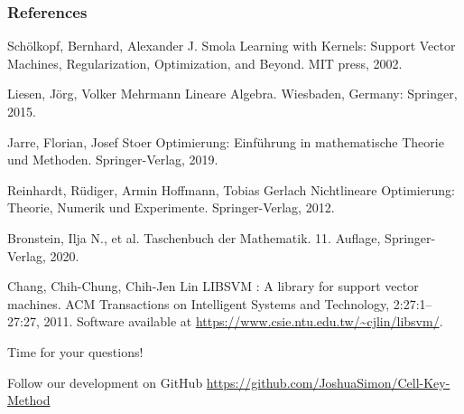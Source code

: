 \documentclass[aspectratio=169]{beamer}
\begin{document}
\begin{frame}
    \frametitle{References}
    \footnotesize{
        \begin{thebibliography}{99} %
             Schölkopf, Bernhard, Alexander J. Smola
            \newblock Learning with Kernels: Support Vector Machines, Regularization, Optimization, and Beyond. MIT press, 2002.

             Liesen, Jörg, Volker Mehrmann
            \newblock Lineare Algebra. Wiesbaden, Germany: Springer, 2015.

             Jarre, Florian, Josef Stoer
            \newblock Optimierung: Einführung in mathematische Theorie und Methoden. Springer-Verlag, 2019.

             Reinhardt, Rüdiger, Armin Hoffmann, Tobias Gerlach
            \newblock Nichtlineare Optimierung: Theorie, Numerik und Experimente. Springer-Verlag, 2012.

              Bronstein, Ilja N., et al. 
            \newblock Taschenbuch der Mathematik. 11. Auflage, Springer-Verlag, 2020.

             Chang, Chih-Chung, Chih-Jen Lin
            \newblock LIBSVM : A library for support vector machines. ACM Transactions on Intelligent Systems and Technology, 2:27:1--27:27, 2011. Software available at \url{https://www.csie.ntu.edu.tw/~cjlin/libsvm/}.

        \end{thebibliography}
    }
\end{frame}


\begin{frame}
    \Huge{\centerline{Time for your questions!}}
    \bigskip
    \bigskip
    \bigskip
    \bigskip

    \normalsize
    \centering
    Follow our development on GitHub  
    \url{https://github.com/JoshuaSimon/Cell-Key-Method}
    
\end{frame}

\end{document}
